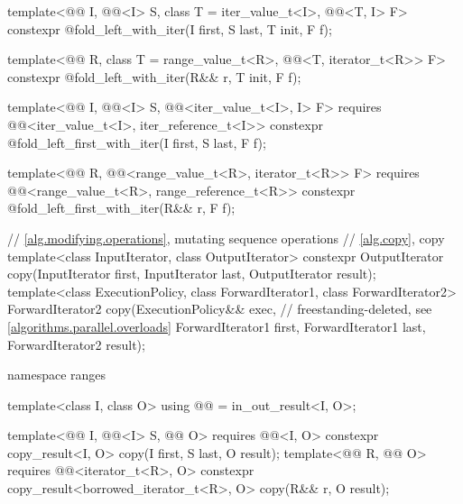 \begin{codeblock}
{{    template<@@ I, @@<I> S, class T = iter_value_t<I>,
             @@<T, I> F>
      constexpr @\seebelow@ fold_left_with_iter(I first, S last, T init, F f);

    template<@@ R, class T = range_value_t<R>,
             @@<T, iterator_t<R>> F>
      constexpr @\seebelow@ fold_left_with_iter(R&& r, T init, F f);

    template<@@ I, @@<I> S,
             @@<iter_value_t<I>, I> F>
      requires @@<iter_value_t<I>, iter_reference_t<I>>
      constexpr @\seebelow@ fold_left_first_with_iter(I first, S last, F f);

    template<@@ R,
             @@<range_value_t<R>, iterator_t<R>> F>
      requires @@<range_value_t<R>, range_reference_t<R>>
      constexpr @\seebelow@ fold_left_first_with_iter(R&& r, F f);
  }

  // \ref{alg.modifying.operations}, mutating sequence operations
  // \ref{alg.copy}, copy
  template<class InputIterator, class OutputIterator>
    constexpr OutputIterator copy(InputIterator first, InputIterator last,
                                  OutputIterator result);
  template<class ExecutionPolicy, class ForwardIterator1, class ForwardIterator2>
    ForwardIterator2 copy(ExecutionPolicy&& exec,               // freestanding-deleted, see \ref{algorithms.parallel.overloads}
                          ForwardIterator1 first, ForwardIterator1 last,
                          ForwardIterator2 result);

  namespace ranges {
    template<class I, class O>
      using @@ = in_out_result<I, O>;

    template<@@ I, @@<I> S, @@ O>
      requires @@<I, O>
      constexpr copy_result<I, O>
        copy(I first, S last, O result);
    template<@@ R, @@ O>
      requires @@<iterator_t<R>, O>
      constexpr copy_result<borrowed_iterator_t<R>, O>
        copy(R&& r, O result);

}}
\end{codeblock}
